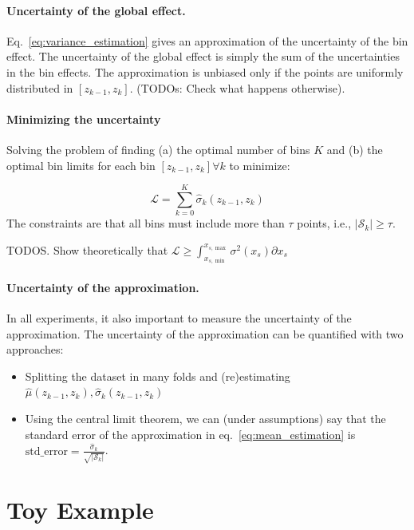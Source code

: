 \documentclass{article}
\begin{document}
\paragraph{Uncertainty of the global effect.}

Eq.~\eqref{eq:variance_estimation} gives an approximation of the
uncertainty of the bin effect.
The uncertainty of the global effect is
simply the sum of the uncertainties in the bin effects.
The
approximation is unbiased only if the points are uniformly distributed
in \([z_{k-1}, z_k]\). (TODOs: Check what happens otherwise).

\paragraph{Minimizing the uncertainty}

Solving the problem of finding (a) the optimal number of bins \(K\) and (b) the optimal bin limits for each bin \([z_{k-1}, z_k] \forall k\) to minimize:

\begin{equation}
  \label{eq:1}
  \mathcal{L} = \sum_{k=0}^K \hat{\sigma}_k(z_{k-1}, z_k)
\end{equation}
%
The constraints are that all bins must include more than \(\tau\)
points, i.e., \(|\mathcal{S}_k| \geq \tau\).

\noindent
TODOS. Show theoretically that \(\mathcal{L} \geq \int_{x_{s, \min}}^{x_{s, \max}}\sigma^2(x_s) \partial x_s\)

\paragraph{Uncertainty of the approximation.}

In all experiments, it also important to measure the uncertainty of
the approximation.
The uncertainty of the approximation can be
quantified with two approaches:

\begin{itemize}
\item Splitting the dataset in many folds and (re)estimating
  \(\hat{\mu}(z_{k-1}, z_k), \hat{\sigma}_k(z_{k-1}, z_k)\)
\item Using the central limit theorem, we can (under assumptions) say
  that the standard error of the approximation in
  eq.~\eqref{eq:mean_estimation} is
  \(\mathrm{std\_error} =
  \frac{\hat{\sigma}_k}{\sqrt{|\mathcal{S}_k|}}\).
\end{itemize}

\section{Toy Example}
\label{sec:toy-example}
\end{document}
